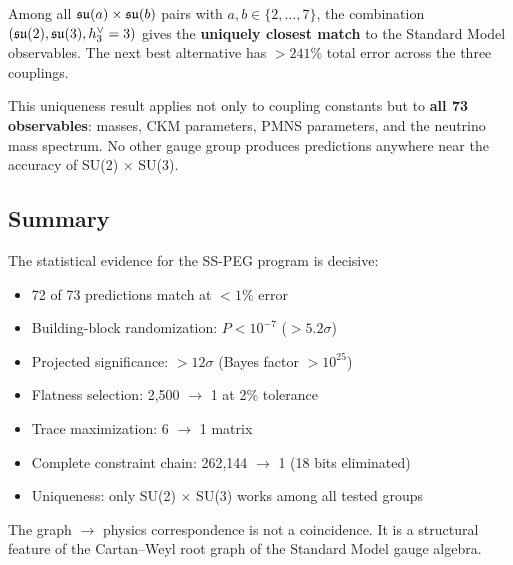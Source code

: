 Among all $\mathfrak{su}(a) \times \mathfrak{su}(b)$ pairs with $a, b \in \{2, \ldots, 7\}$, the combination $(\mathfrak{su}(2), \mathfrak{su}(3), h^\vee_3 = 3)$ gives the \textbf{uniquely closest match} to the Standard Model observables. The next best alternative has $> 241\%$ total error across the three couplings.

This uniqueness result applies not only to coupling constants but to \textbf{all 73 observables}: masses, CKM parameters, PMNS parameters, and the neutrino mass spectrum. No other gauge group produces predictions anywhere near the accuracy of SU(2) $\times$ SU(3).

\subsection{Summary}\label{sec:stat_summary}

The statistical evidence for the SS-PEG program is decisive:
\begin{itemize}
\item 72 of 73 predictions match at $< 1\%$ error
\item Building-block randomization: $P < 10^{-7}$ ($> 5.2\sigma$)
\item Projected significance: $> 12\sigma$ (Bayes factor $> 10^{25}$)
\item Flatness selection: 2,500 $\to$ 1 at 2\% tolerance
\item Trace maximization: 6 $\to$ 1 matrix
\item Complete constraint chain: 262,144 $\to$ 1 (18 bits eliminated)
\item Uniqueness: only SU(2) $\times$ SU(3) works among all tested groups
\end{itemize}

The graph $\to$ physics correspondence is not a coincidence. It is a structural feature of the Cartan--Weyl root graph of the Standard Model gauge algebra.
